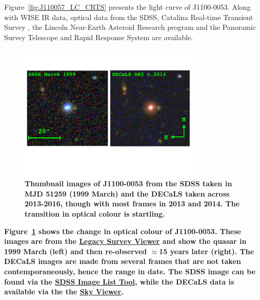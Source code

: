 \documentclass[a4paper,fleqn,usenatbib]{mnras}
\begin{document}
Figure~\ref{fig:J110057_LC_CRTS} presents the light curve of
J1100-0053.  Along with WISE IR data, optical data from the SDSS,
Catalina Real-time Transient Survey \citep[CRTS;][]{Drake2009,
Mahabal2011}, the Lincoln Near-Earth Asteroid Research \citep[LINEAR;
][]{Sesar2011} program and the Panoramic Survey Telescope and Rapid
Response System \citep[PanSTARRS;][]{Kaiser2010, Stubbs2010,
Tonry2012, Magnier2013} are available.

\begin{figure}
  \centering
  \includegraphics[width=8.7cm, trim=0.0cm 0.0cm 0.0cm 0.0cm, clip]
  {../images/J1100_0053_thumbnails.pdf}
  \vspace{-16pt}
  \caption[]{{\bf Thumbnail images of J1100-0053 from the SDSS taken
in MJD 51259 (1999 March) and the DECaLS taken across 2013-2016, though with most
frames in 2013 and 2014.  The transition in optical colour is
startling.}
}
\vspace{-12pt}
\label{fig:J110057_thumbnails}
\end{figure}
{\bf Figure~\ref{fig:J110057_thumbnails} shows the change in optical
colour of J1100-0053. These images are from the
\href{legacysurvey.org/viewer}{Legacy Survey Viewer} and show the
quasar in 1999 March (left) and then re-observed $\approx$15 years
later (right).  The DECaLS images are made from several frames that
are not taken contemporaneously, hence the range in date.  The SDSS
image can be found via the
\href{https://skyserver.sdss.org/dr14/en/tools/chart/navi.aspx?ra=165.240463&dec=-0.884586&scale=0.2&width=120&height=120&opt=}{SDSS
Image List Tool}, while the DECaLS data is available via the the
\href{http://legacysurvey.org/viewer/data-for-radec/?ra=165.2404&dec=-0.8847&layer=decals-dr3}{Sky
Viewer}.}
\end{document}
